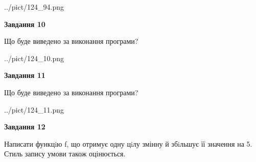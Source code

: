 \documentclass[12pt, ukrainian]{article}
\begin{document}
{\begin {large}
\begin{center}
	{../pict/124_94.png}
\end{center}
\newpage

{\begin {center}\textbf{Завдання 10}\end {center}}

Що буде виведено за виконання програми?\par
\begin{center}
	{../pict/124_10.png}
\end{center}
\newpage

{\begin {center}\textbf{Завдання 11}\end {center}}

Що буде виведено за виконання програми?\par
\begin{center}
	{../pict/124_11.png}
\end{center}
\newpage

{\begin {center}\textbf{Завдання 12}\end {center}}


Написати функцiю f, що отримує одну цiлу змінну й збiльшує її значення на 5. Стиль запису умови також оцінюється.\par
\newpage

\end {large}}
\end{document}
